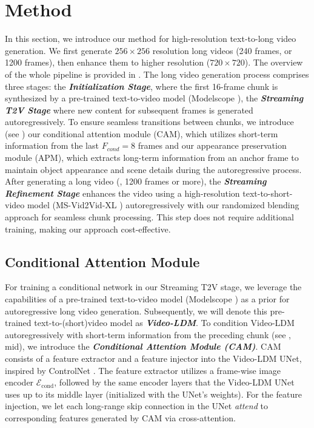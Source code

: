 \section{Method}

In this section, we introduce our method for high-resolution text-to-long video generation.
We first generate $256 \times 256$ resolution long videos (240 frames, or 1200 frames), then enhance them to higher resolution ($720\times 720$).
The overview of the whole pipeline is provided in .
The long video generation process comprises three stages: the \textbf{\textit{Initialization Stage}}, where the first 16-frame chunk is synthesized by a pre-trained text-to-video model (\eg Modelscope \cite{Modelscope}), the \textbf{\textit{Streaming T2V Stage}} where new content for subsequent frames is generated autoregressively. To ensure seamless transitions between chunks, we introduce (see ) our conditional attention module (CAM), which utilizes short-term information from the last $F_{cond}=8$ frames and our appearance preservation module (APM), which extracts long-term information from an  anchor frame to maintain object appearance and scene details during the autoregressive process. 
%
After generating a long video (, 1200 frames or more), the \textbf{\textit{Streaming Refinement Stage}} enhances the video using a high-resolution text-to-short-video model (\eg MS-Vid2Vid-XL \cite{2023i2vgenxl}) autoregressively with our randomized blending approach for seamless chunk processing. This step does not require additional training, making our approach cost-effective. 


\subsection{Conditional Attention Module}
\label{ssec:cam}
For training a conditional network in our Streaming T2V stage, we leverage the capabilities of a pre-trained text-to-video model (\eg Modelscope \cite{Modelscope}) as a prior for autoregressive long video generation. Subsequently, we will denote this pre-trained text-to-(short)video model as \textbf{\textit{Video-LDM}}.
%
To condition Video-LDM autoregressively with short-term information from the preceding chunk (see , mid), we introduce the \textit{\textbf{Conditional Attention Module (CAM)}}. CAM consists of a feature extractor and a feature injector into the Video-LDM UNet, inspired by ControlNet \cite{controlnet}.
%
The feature extractor utilizes a frame-wise image encoder  $\mathcal{E}_{\text{cond}}$, followed by the same encoder layers that the Video-LDM UNet uses up to its middle layer (initialized with the UNet's weights).
For the feature injection, we let each long-range skip connection in the UNet \textit{attend} to corresponding features generated by CAM via cross-attention. 

